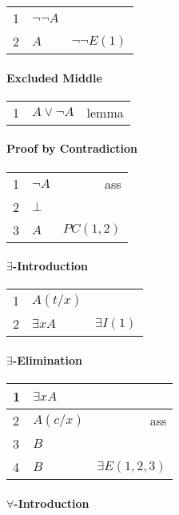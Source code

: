 \documentclass[10pt,twoside,twocolumn]{article}
\providecommand{\tabularnewline}{\\}
\begin{document}
\begin{tabular}{llr}
1 & $\lnot\lnot A$ & \tabularnewline
2 & $A$ & $\lnot\lnot E\left(1\right)$\tabularnewline
\end{tabular}


\paragraph{Excluded Middle}

\begin{tabular}{llr}
1 & $A\lor\lnot A$ & lemma\tabularnewline
\end{tabular}


\paragraph{Proof by Contradiction}

\begin{tabular}{|llr|}
\hline 
1 & $\lnot A$ & ass\tabularnewline
2 & $\bot$ & \tabularnewline
\hline 
\multicolumn{1}{l}{3} & $A$ & \multicolumn{1}{r}{$PC\left(1,2\right)$}\tabularnewline
\end{tabular}


\paragraph{$\boldsymbol{\exists}$-Introduction}

\begin{tabular}{llr}
1 & $A\left(t/x\right)$ & \tabularnewline
2 & $\exists xA$ & $\exists I\left(1\right)$\tabularnewline
\end{tabular}


\paragraph{$\boldsymbol{\exists}$-Elimination}

\begin{tabular}{|llr|}
\multicolumn{1}{l}{1} & $\exists xA$ & \multicolumn{1}{r}{}\tabularnewline
\hline 
2 & $A\left(c/x\right)$ & ass\tabularnewline
3 & $B$ & \tabularnewline
\hline 
\multicolumn{1}{l}{4} & $B$ & \multicolumn{1}{r}{$\exists E\left(1,2,3\right)$}\tabularnewline
\end{tabular}


\paragraph{$\boldsymbol{\forall}$-Introduction}
\end{document}
